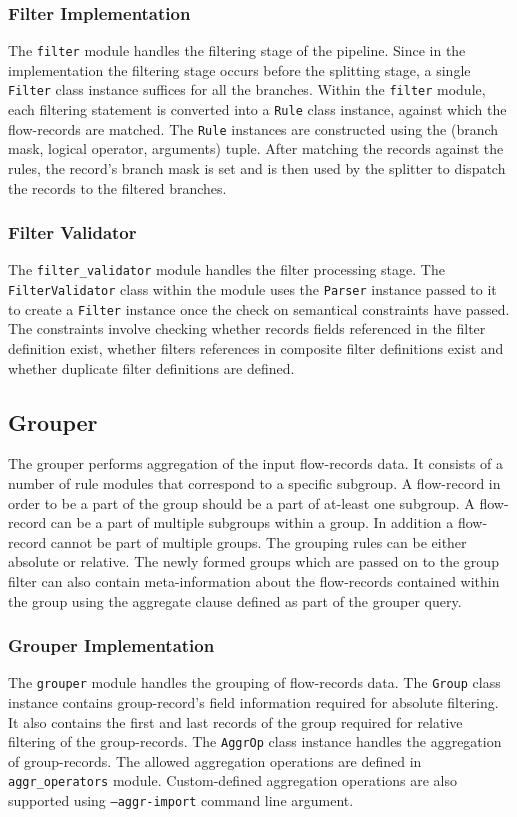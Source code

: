 \subsubsection{Filter Implementation}\label{subsubsec:filter-impl}
The \texttt{filter} module handles the filtering stage of the pipeline. Since in the implementation the filtering stage occurs before the splitting stage, a single \texttt{Filter} class instance suffices for all the branches. Within the \texttt{filter} module, each filtering statement is converted into a \texttt{Rule} class instance, against which the flow-records are matched. The \texttt{Rule} instances are constructed using the (branch mask, logical operator, arguments) tuple. After matching the records against the rules, the record's branch mask is set and is then used by the splitter to dispatch the records to the filtered branches.

\subsubsection{Filter Validator}\label{subsubsec:filter-validator}
The \texttt{filter\_validator} module handles the filter processing stage. The \texttt{FilterValidator} class within the module uses the \texttt{Parser} instance passed to it to create a \texttt{Filter} instance once the check on semantical constraints have passed. The constraints involve checking whether records fields referenced in the filter definition exist, whether filters references in composite filter definitions exist and whether duplicate filter definitions are defined.

\subsection{Grouper}\label{subsec:grouper}
The grouper performs aggregation of the input flow-records data. It consists of a number of rule modules that correspond to a specific subgroup. A flow-record in order to be a part of the group should be a part of at-least one subgroup. A flow-record can be a part of multiple subgroups within a group. In addition a flow-record cannot be part of multiple groups. The grouping rules can be either absolute or relative. The newly formed groups which are passed on to the group filter can also contain meta-information about the flow-records contained within the group using the aggregate clause defined as part of the grouper query.

\subsubsection{Grouper Implementation}\label{subsubsec:grouper-impl}
The \texttt{grouper} module handles the grouping of flow-records data. The \texttt{Group} class instance contains group-record's field information required for absolute filtering. It also contains the first and last records of the group required for relative filtering of the group-records. The \texttt{AggrOp} class instance handles the aggregation of group-records. The allowed aggregation operations are defined in \texttt{aggr\_operators} module. Custom-defined aggregation operations are also supported using \texttt{--aggr-import} command line argument.

